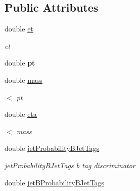 \subsection*{Public Attributes}
\begin{DoxyCompactItemize}
\item 
\hypertarget{structran_1_1JetStruct_a935690381685df633c696534d0ac6216}{double \hyperlink{structran_1_1JetStruct_a935690381685df633c696534d0ac6216}{et}}\label{structran_1_1JetStruct_a935690381685df633c696534d0ac6216}

\begin{DoxyCompactList}\small\item\em et \end{DoxyCompactList}\item 
\hypertarget{structran_1_1JetStruct_abcccf8da31a44023609d0a768eb05221}{double {\bfseries pt}}\label{structran_1_1JetStruct_abcccf8da31a44023609d0a768eb05221}

\item 
\hypertarget{structran_1_1JetStruct_a46830c9571b7065d242d099ae64b4875}{double \hyperlink{structran_1_1JetStruct_a46830c9571b7065d242d099ae64b4875}{mass}}\label{structran_1_1JetStruct_a46830c9571b7065d242d099ae64b4875}

\begin{DoxyCompactList}\small\item\em $<$ pt \end{DoxyCompactList}\item 
double \hyperlink{structran_1_1JetStruct_a164bcdb9e674202cd0e73ee7fabafd36}{eta}
\begin{DoxyCompactList}\small\item\em $<$ mass \end{DoxyCompactList}\item 
\hypertarget{structran_1_1JetStruct_a1291f96fa4663a65c252a510538723d5}{double \hyperlink{structran_1_1JetStruct_a1291f96fa4663a65c252a510538723d5}{jet\-Probability\-B\-Jet\-Tags}}\label{structran_1_1JetStruct_a1291f96fa4663a65c252a510538723d5}

\begin{DoxyCompactList}\small\item\em jet\-Probability\-B\-Jet\-Tags b tag discriminator \end{DoxyCompactList}\item 
\hypertarget{structran_1_1JetStruct_a8da7809055faff45b30b70a43ac67447}{double \hyperlink{structran_1_1JetStruct_a8da7809055faff45b30b70a43ac67447}{jet\-B\-Probability\-B\-Jet\-Tags}}\label{structran_1_1JetStruct_a8da7809055faff45b30b70a43ac67447}


\end{DoxyCompactItemize}
